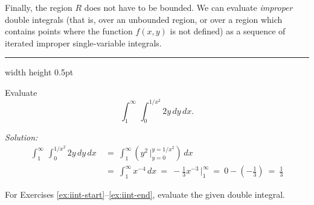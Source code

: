 Finally, the region $R$ does not have to be
bounded. 
We can evaluate \emph{improper} double integrals 
(that is, over an unbounded region, or over a region which
contains points where the function $f(x,y)$ is not defined) 
as a sequence of iterated improper single-variable
integrals.

\medskip
\hrule width \textwidth height 0.5pt

\begin{exmp}
 Evaluate 
 \[\int_1^{\infty}\, \int_0^{1/{x^2}} 2y \,dy\,dx.\]
\par\noindent \emph{Solution:}
 \begin{align*}
  \int_1^{\infty} \,\int_0^{1/{x^2}} 2y \,dy\,dx ~&=~
   \int_1^{\infty} \left(y^2 \,\Big|_{y=0}^{y=1/{x^2}} \right) \,dx\\
   &=~ \int_1^{\infty} x^{-4}\,dx 
   ~=~ -\tfrac{1}{3} x^{-3} \,\Big|_{1}^{\infty} ~=~ 0 - (-\tfrac{1}{3}) ~=~ \tfrac{1}{3}
 \end{align*}
\end{exmp}
\startexercises\label{sec3dot2}
\par\noindent For Exercises \ref{ex:iint-start}--\ref{ex:iint-end}, evaluate the given double integral.
